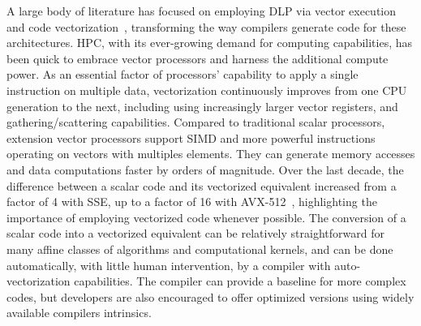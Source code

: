 \documentclass[5p,times,twocolumn]{elsarticle}
\begin{document}
A large body of literature has focused on employing DLP via vector
execution and code vectorization~\cite{VectorizingCompilers1,vectorizingcompilers,SIMDVectorOperations}, transforming the way compilers generate code for these architectures. HPC, with its ever-growing demand for computing capabilities, has been quick to embrace vector processors and harness the additional compute power.
As an essential factor of processors' capability to apply
a single instruction on multiple data, vectorization continuously improves
from one CPU generation to the next, including using increasingly larger vector registers, and gathering/scattering capabilities.
Compared to traditional scalar processors, extension vector processors support
SIMD and more powerful instructions operating
on vectors with multiples elements. They can generate memory accesses and data computations faster by orders of magnitude.
Over the last decade, the difference between a scalar code and its vectorized equivalent
increased from a factor of 4 with SSE, up to a factor of 16 with AVX-512~\cite{PentiumIII,Haswelldetail,avx-info}, highlighting the importance of employing vectorized code whenever possible.
The conversion of a scalar code into a vectorized
equivalent can be relatively straightforward for many affine classes of algorithms
and computational kernels, and can be done automatically, with little human intervention, by a compiler
with auto-vectorization capabilities. The compiler can provide a baseline for more complex codes,
but developers are also encouraged to offer optimized versions using
widely available compilers intrinsics.
%
\end{document}
